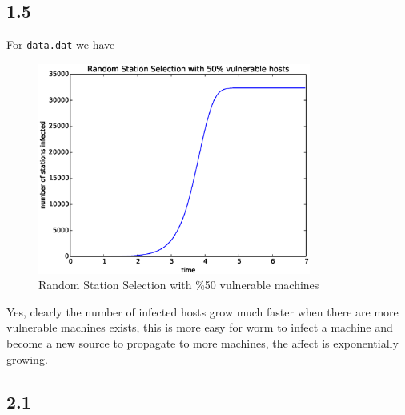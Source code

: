 \documentclass[10pt]{article}
\begin{document}
\subsection*{1.5}
For \texttt{data.dat} we have

\begin{figure}[H]
\begin{center}
\includegraphics[width=0.8\textwidth]{figure1.5.eps}
\caption{Random Station Selection with \%50 vulnerable machines}
\end{center}
\end{figure}

Yes, clearly the number of infected hosts grow much faster when there are more vulnerable machines exists, this is more easy for worm to infect a machine and become a new source to propagate to more machines, the affect is exponentially growing.

\subsection*{2.1}
\end{document}
